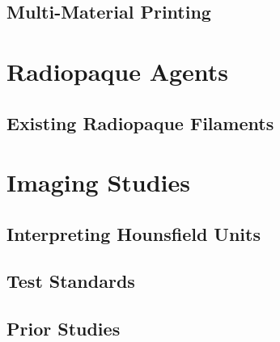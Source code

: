 \subsection{Multi-Material Printing\label{sec:literaturereview:alternativeDevices:multiMaterialPrinting}}

\section{Radiopaque Agents\label{sec:literatureReview:radiopaque}}

\subsection{Existing Radiopaque Filaments\label{sec:literatureReview:radiopaque:filaments}}

\section{Imaging Studies\label{sec:literatureReview:imaging}}

\subsection{Interpreting Hounsfield Units\label{sec:literatureReview:imaging:HU}}

\subsection{Test Standards\label{sec:literatureReview:imaging:standards}}

\subsection{Prior Studies\label{sec:literatureReview:imaging:priorStudies}}

